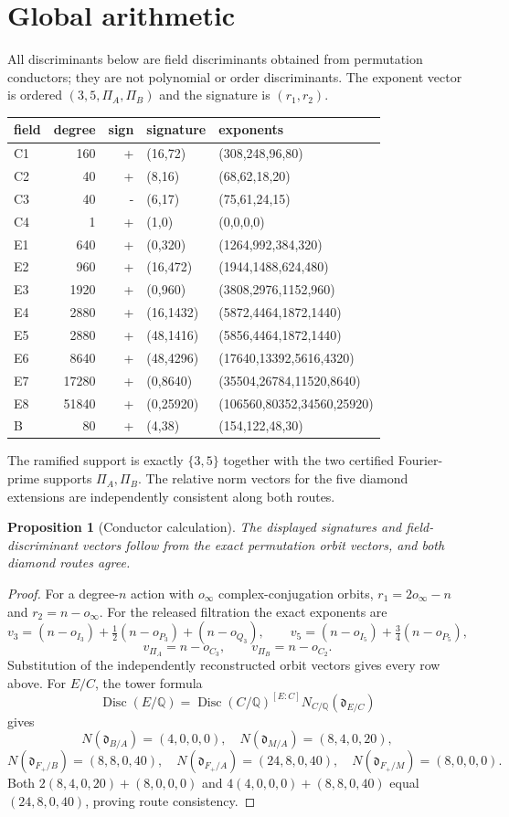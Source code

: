 \documentclass[11pt]{article}
\newtheorem{proposition}[theorem]{Proposition}
\newcommand{\Q}{\mathbb Q}
\begin{document}
\section{Global arithmetic}
All discriminants below are field discriminants obtained from permutation conductors; they are
not polynomial or order discriminants.  The exponent vector is ordered $(3,5,\Pi_A,\Pi_B)$ and
the signature is $(r_1,r_2)$.
\begin{center}\scriptsize
\begin{tabular}{@{}lrrll@{}}\toprule field&degree&sign&signature&exponents\\\midrule
C1&160&+&(16,72)&(308,248,96,80)\\C2&40&+&(8,16)&(68,62,18,20)\\C3&40&-&(6,17)&(75,61,24,15)\\C4&1&+&(1,0)&(0,0,0,0)\\
E1&640&+&(0,320)&(1264,992,384,320)\\E2&960&+&(16,472)&(1944,1488,624,480)\\E3&1920&+&(0,960)&(3808,2976,1152,960)\\
E4&2880&+&(16,1432)&(5872,4464,1872,1440)\\E5&2880&+&(48,1416)&(5856,4464,1872,1440)\\E6&8640&+&(48,4296)&(17640,13392,5616,4320)\\
E7&17280&+&(0,8640)&(35504,26784,11520,8640)\\E8&51840&+&(0,25920)&(106560,80352,34560,25920)\\B&80&+&(4,38)&(154,122,48,30)\\\bottomrule\end{tabular}\end{center}
The ramified support is exactly $\{3,5\}$ together with the two certified Fourier-prime
supports $\Pi_A,\Pi_B$.  The relative norm vectors for the five diamond extensions are
independently consistent along both routes.

\begin{proposition}[Conductor calculation]\label{prop:global}
The displayed signatures and field-discriminant vectors follow from the exact permutation
orbit vectors, and both diamond routes agree.
\end{proposition}
\begin{proof}
For a degree-$n$ action with $o_\infty$ complex-conjugation orbits,
$r_1=2o_\infty-n$ and $r_2=n-o_\infty$.  For the released filtration the exact exponents are
\[
v_3=(n-o_{I_3})+\tfrac12(n-o_{P_3})+(n-o_{Q_3}),\qquad
v_5=(n-o_{I_5})+\tfrac34(n-o_{P_5}),
\]
\[
v_{\Pi_A}=n-o_{C_3},\qquad v_{\Pi_B}=n-o_{C_2}.
\]
Substitution of the independently reconstructed orbit vectors gives every row above.  For
$E/C$, the tower formula
\[
\operatorname{Disc}(E/\Q)=\operatorname{Disc}(C/\Q)^{[E:C]}
N_{C/\Q}(\mathfrak d_{E/C})
\]
gives
\[
N(\mathfrak d_{B/A})=(4,0,0,0),\quad N(\mathfrak d_{M/A})=(8,4,0,20),
\]
\[
N(\mathfrak d_{F_+/B})=(8,8,0,40),\quad
N(\mathfrak d_{F_+/A})=(24,8,0,40),\quad N(\mathfrak d_{F_+/M})=(8,0,0,0).
\]
Both $2(8,4,0,20)+(8,0,0,0)$ and $4(4,0,0,0)+(8,8,0,40)$ equal
$(24,8,0,40)$, proving route consistency.
\end{proof}
\end{document}
